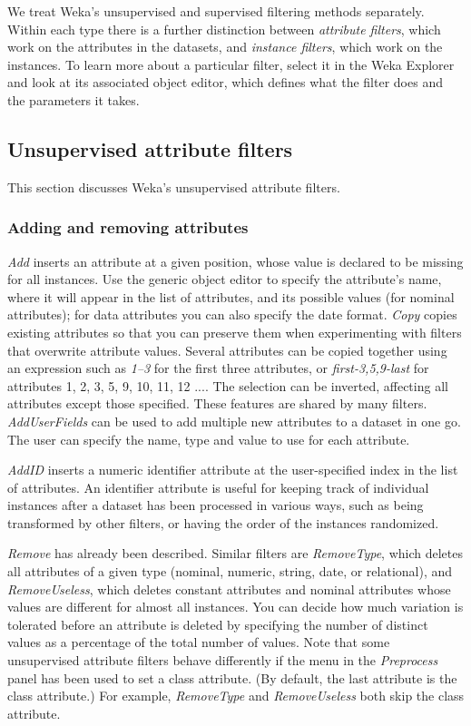 We treat Weka’s unsupervised and supervised filtering methods
separately. Within each type there is a further distinction between
\textit{attribute filters}, which work on the attributes in the
datasets, and \textit{instance filters}, which work on the
instances. To learn more about a particular filter, select it in the
Weka Explorer and look at its associated object editor, which defines
what the filter does and the parameters it takes.

\subsection{Unsupervised attribute filters}

This section discusses Weka's unsupervised attribute filters.

\subsubsection{Adding and removing attributes}

\textit{Add} inserts an attribute at a given position, whose value is
declared to be missing for all instances. Use the generic object
editor to specify the attribute's name, where it will appear in the
list of attributes, and its possible values (for nominal attributes);
for data attributes you can also specify the date
format. \textit{Copy} copies existing attributes so that you can
preserve them when experimenting with filters that overwrite attribute
values. Several attributes can be copied together using an expression
such as \textit{1–3} for the first three attributes, or
\textit{first-3,5,9-last} for attributes 1, 2, 3, 5, 9, 10, 11, 12
.... The selection can be inverted, affecting all attributes except
those specified. These features are shared by many
filters. \textit{AddUserFields} can be used to add multiple new
attributes to a dataset in one go. The user can specify the name, type
and value to use for each attribute.

\textit{AddID} inserts a numeric identifier attribute at the user-specified
index in the list of attributes. An identifier attribute is useful for
keeping track of individual instances after a dataset has been
processed in various ways, such as being transformed by other filters,
or having the order of the instances randomized.

\textit{Remove} has already been described. Similar filters are
\textit{RemoveType}, which deletes all attributes of a given type
(nominal, numeric, string, date, or relational), and
\textit{RemoveUseless}, which deletes constant attributes and nominal
attributes whose values are different for almost all instances. You
can decide how much variation is tolerated before an attribute is
deleted by specifying the number of distinct values as a percentage of
the total number of values. Note that some unsupervised attribute
filters behave differently if the menu in the \textit{Preprocess}
panel has been used to set a class attribute. (By default, the last
attribute is the class attribute.)  For example, \textit{RemoveType}
and \textit{RemoveUseless} both skip the class attribute.

